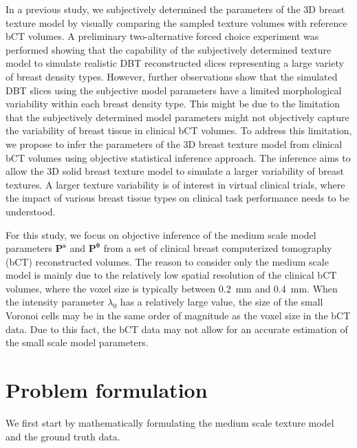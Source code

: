 \documentclass[journal]{IEEEtran}
\begin{document}
In a previous study, we subjectively determined the parameters of the
3D breast texture model by visually comparing the sampled texture
volumes with reference bCT volumes. A preliminary two-alternative
forced choice experiment was performed showing that the capability of
the subjectively determined texture model to simulate realistic DBT
reconstructed slices representing a large variety of breast density
types. However, further observations show that the simulated DBT
slices using the subjective model parameters have a limited
morphological variability within each breast density type.  This might
be due to the limitation that the subjectively determined model
parameters might not objectively capture the variability of breast
tissue in clinical bCT volumes.  To address this limitation, we
propose to infer the parameters of the 3D breast texture model from
clinical bCT volumes using objective statistical inference
approach. The inference aims to allow the 3D solid breast texture
model to simulate a larger variability of breast textures. A larger
texture variability is of interest in virtual clinical trials, where
the impact of various breast tissue types on clinical task performance
needs to be understood.

For this study, we focus on objective inference of the
medium scale model parameters $\mathbf{P}^{\mathbf{s}}$ and
$\mathbf{P}^{\boldsymbol{\theta}}$ from a set of clinical breast
computerized tomography (bCT) reconstructed volumes. The reason to
consider only the medium scale model is mainly due to the relatively
low spatial resolution of the clinical bCT volumes, where the voxel
size is typically between \SI{0.2}{\mm} and \SI{0.4}{\mm}. When the
intensity parameter $\lambda_0$ has a relatively large value, the size
of the small Voronoi cells may be in the same order of magnitude as
the voxel size in the bCT data. Due to this fact, the bCT data may not
allow for an accurate estimation of the small scale model parameters.

\section{Problem formulation}
\label{sec:problem-statement}


We first start by mathematically formulating the medium scale texture
model and the ground truth data.
\end{document}
